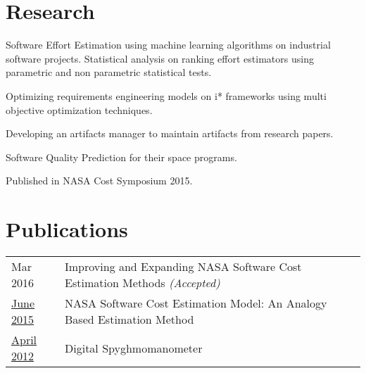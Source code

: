 \documentclass[]{bigfatnoob-resume}
\begin{document}
\begin{minipage}[t]{0.66\textwidth}

\section{Research}
\begin{tightemize}
\item Software Effort Estimation using machine learning algorithms on industrial software projects. Statistical analysis on ranking effort estimators using parametric and non parametric statistical tests.
\item Optimizing requirements engineering models on i* frameworks using multi objective optimization techniques.
\item Developing an artifacts manager to maintain artifacts from research papers.
\end{tightemize}
\sectionsep

\descript{}
\begin{tightemize}
\item Software Quality Prediction for their space programs.
\item Published in NASA Cost Symposium 2015.
\end{tightemize}
\sectionsep


\section{Publications} 
\begin{tabular}{p{2cm}p{9.2cm}}
	{Mar 2016} & Improving and Expanding NASA Software Cost Estimation Methods \textit{(Accepted)}\\
	\href{https://www.nasa.gov/sites/default/files/files/27_NASA_SC_SW_Cost_Model_final.pdf}{June 2015}  & NASA Software Cost Estimation Model: An Analogy Based Estimation Method\\
	\href{http://georgevmathew.com/other-files/Digital_Sphygmomanometer.pdf}{April 2012} & Digital Spyghmomanometer\\
\end{tabular}
\sectionsep

\end{minipage} 
\end{document}
